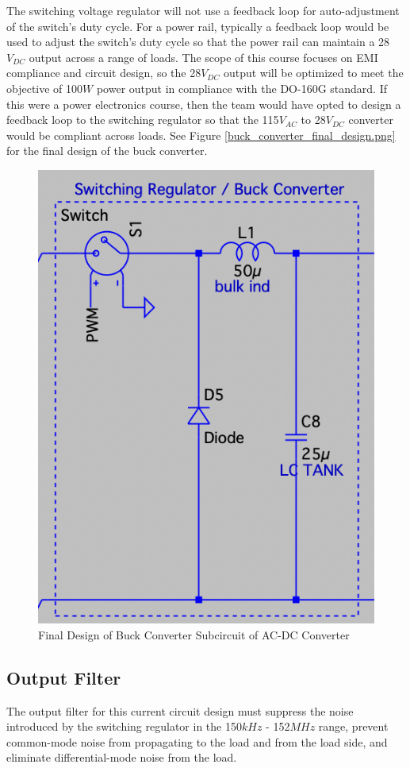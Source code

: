 \documentclass[conference]{IEEEtran}
\begin{document}
The switching voltage regulator will not use a feedback loop for auto-adjustment of the switch's duty cycle. For a power rail, typically a feedback loop would be used to adjust the switch's duty cycle so that the power rail can maintain a 28$V_{DC}$ output across a range of loads. The scope of this course focuses on EMI compliance and circuit design, so the 28$V_{DC}$ output will be optimized to meet the objective of 100$W$ power output in compliance with the DO-160G standard. If this were a power electronics course, then the team would have opted to design a feedback loop to the switching regulator so that the 115$V_{AC}$ to 28$V_{DC}$ converter would be compliant across loads. See Figure \ref{buck_converter_final_design.png} for the final design of the buck converter.

\begin{figure}[htp]
    \centering
    \includegraphics[width=0.7\linewidth]{buck_converter_final_design.png}
    \caption{Final Design of Buck Converter Subcircuit of AC-DC Converter}
    \label{fig:buck_converter_final_design_diagram}
\end{figure}

\subsection{Output Filter}
The output filter for this current circuit design must suppress the noise introduced by the switching regulator in the 150${kHz}$ - 152${MHz}$ range, prevent common-mode noise from propagating to the load and from the load side, and eliminate differential-mode noise from the load. 
\end{document}
